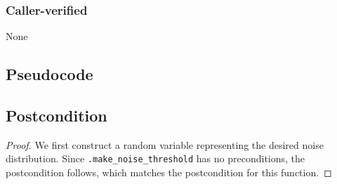 \documentclass{article}
\begin{document}
\subsubsection*{Caller-verified}
None

\subsection*{Pseudocode}


\subsection*{Postcondition}
\begin{theorem}
\end{theorem}

\begin{proof}
    We first construct a random variable  representing the desired noise distribution.
    Since \texttt{.make\_noise\_threshold} has no preconditions,
    the postcondition follows, which matches the postcondition for this function.
\end{proof}
\end{document}
